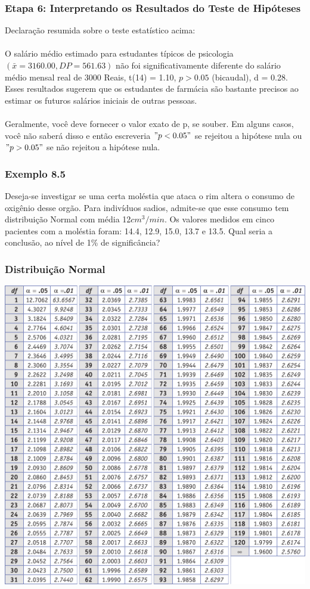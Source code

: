 \documentclass[11pt]{beamer}
\begin{document}
\begin{frame}
\frametitle{Etapa 6: Interpretando os Resultados do Teste de Hipóteses}

Declaração resumida sobre o teste estatístico acima:\\~\\

O salário médio estimado para estudantes típicos de psicologia $(\bar{x} = 3160.00, DP = 561.63)$ não foi significativamente diferente do salário médio mensal real de 3000 Reais, t(14) = 1.10, $p > 0.05$ (bicaudal), d = 0.28. Esses resultados sugerem que os estudantes de farmácia são bastante precisos ao estimar os futuros salários iniciais de outras pessoas.\\~\\

Geralmente, você deve fornecer o valor exato de p, se souber. Em alguns casos, você não saberá disso e então escreveria \("p < 0.05"\) se rejeitou a hipótese nula ou \("p > 0.05"\) se não rejeitou a hipótese nula.
\end{frame}

\begin{frame}
\frametitle{Exemplo 8.5}
Deseja-se investigar se uma certa moléstia que ataca o rim altera o consumo de oxigênio desse orgão. Para indivíduos sadios, admite-se que esse consumo tem distribuição Normal com média 12\(cm^3/min\). Os valores medidos em cinco pacientes com a moléstia foram: 14.4, 12.9, 15.0, 13.7 e 13.5. Qual seria a conclusão, ao nível de 1\% de significância?
\vspace{1in}
\vspace{1in}

\end{frame}

\begin{frame}
\frametitle{Distribuição Normal}

\begin{center}\includegraphics[width=0.7\linewidth]{figs/tabela_t} \end{center}
\end{frame}
\end{document}

